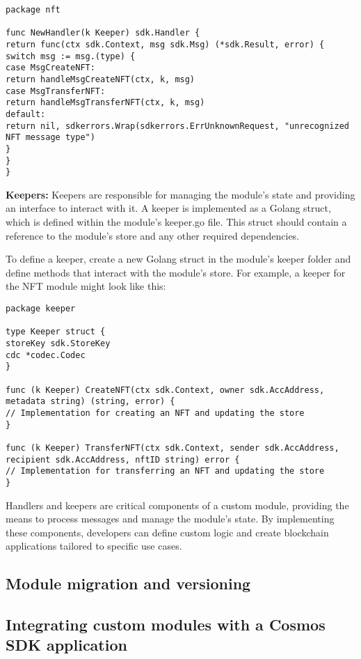 \documentclass{article}
\begin{document}
\begin{lstlisting}[language=Golang]
package nft

func NewHandler(k Keeper) sdk.Handler {
return func(ctx sdk.Context, msg sdk.Msg) (*sdk.Result, error) {
switch msg := msg.(type) {
case MsgCreateNFT:
return handleMsgCreateNFT(ctx, k, msg)
case MsgTransferNFT:
return handleMsgTransferNFT(ctx, k, msg)
default:
return nil, sdkerrors.Wrap(sdkerrors.ErrUnknownRequest, "unrecognized NFT message type")
}
}
}
\end{lstlisting}

\textbf{Keepers:} Keepers are responsible for managing the module's state and providing an interface to interact with it. A keeper is implemented as a Golang struct, which is defined within the module's keeper.go file. This struct should contain a reference to the module's store and any other required dependencies.

To define a keeper, create a new Golang struct in the module's keeper folder and define methods that interact with the module's store. For example, a keeper for the NFT module might look like this:

\begin{lstlisting}[language=Golang]
package keeper

type Keeper struct {
storeKey sdk.StoreKey
cdc *codec.Codec
}

func (k Keeper) CreateNFT(ctx sdk.Context, owner sdk.AccAddress, metadata string) (string, error) {
// Implementation for creating an NFT and updating the store
}

func (k Keeper) TransferNFT(ctx sdk.Context, sender sdk.AccAddress, recipient sdk.AccAddress, nftID string) error {
// Implementation for transferring an NFT and updating the store
}
\end{lstlisting}

Handlers and keepers are critical components of a custom module, providing the means to process messages and manage the module's state. By implementing these components, developers can define custom logic and create blockchain applications tailored to specific use cases.
%
\subsection{Module migration and versioning}
\subsection{Integrating custom modules with a Cosmos SDK application}
\end{document}
